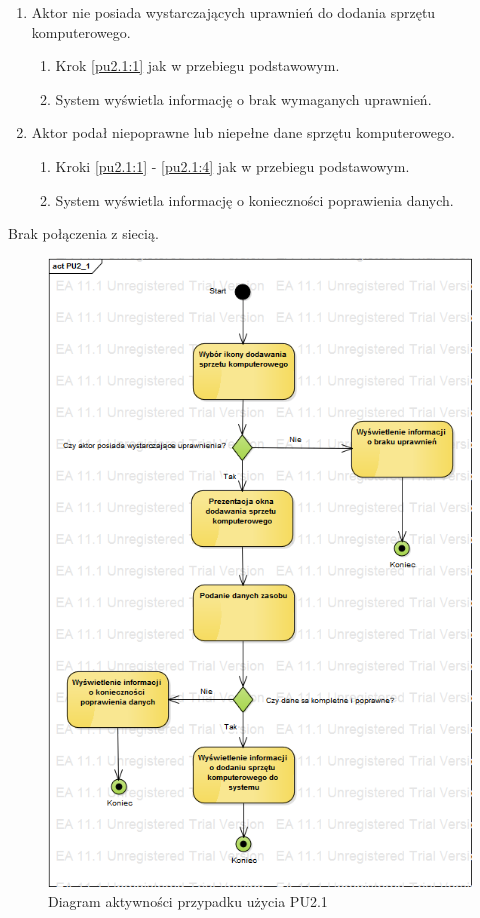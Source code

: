 \begin{enumerate}
\item Aktor nie posiada wystarczających uprawnień do dodania sprzętu komputerowego.
	\begin{enumerate}[label*=\arabic*.]
		\item Krok \ref{pu2.1:1} jak w przebiegu podstawowym.
		\item System wyświetla informację o brak wymaganych uprawnień.
	\end{enumerate}
\item Aktor podał niepoprawne lub niepełne dane sprzętu komputerowego.
	\begin{enumerate}[label*=\arabic*.]
		\item Kroki \ref{pu2.1:1} - \ref{pu2.1:4} jak w przebiegu podstawowym.
		\item System wyświetla informację o konieczności poprawienia danych.
	\end{enumerate}
\end{enumerate}

Brak połączenia z siecią.

\begin{figure}[h!]
	\centering
	\includegraphics[scale=0.6]{img/diagrams/activityDiagrams/PU2_1}
	\caption{Diagram aktywności przypadku użycia PU2.1 \label{fig:labelADPU2.1}}
\end{figure}

